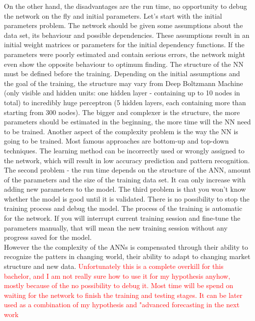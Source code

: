 \documentclass {article}
\begin{document}
On the other hand, the disadvantages are the run time, no opportunity to debug the network on the fly and initial parameters. Let's start with the initial parameters problem. The network should be given some assumptions about the data set, its behaviour and possible dependencies. These assumptions result in an initial weight matrices or parameters for the initial dependency functions. If the parameters were poorly estimated and contain serious errors, the network might even show the opposite behaviour to optimum finding. The structure of the NN must be defined before the training. Depending on the initial assumptions and the goal of the training, the structure may vary from Deep Boltzmann Machine (only visible and hidden units: one hidden layer - containing up to 10 nodes in total) to incredibly huge perceptron (5 hidden layers, each containing more than starting from 300 nodes). The bigger and complexer is the structure, the more parameters should be estimated in the beginning, the more time will the NN need to be trained. Another aspect of the complexity problem is the way the NN is going to be trained. Most famous approaches are bottom-up and top-down techniques. The learning method can be incorrectly used or wrongly assigned to the network, which will result in low accuracy prediction and pattern recognition. The second problem - the run time depends on the structure of the ANN, amount of the parameters and the size of the training data set. It can only increase with adding new parameters to the model. The third problem is that you won't know whether the model is good until it is validated. There is no possibility to stop the training process and debug the model. The process of the training is automatic for the network. If you will interrupt current training session and fine-tune the parameters manually, that will mean the new training session without any progress saved for the model.\\
However the the complexity of the ANNs is compensated through their ability to recognize the patters in changing world, their ability to adapt to changing market structure and new data. \textcolor{red}{Unfortunately this is a complete overkill for this bachelor, and I am not really sure how to use it for my hypothesis anyhow, mostly because of the no possibility to debug it. Most time will be spend on waiting for the network to finish the training and testing stages. It can be later used as a combination of my hypothesis and "advanced forecasting in the next work} \\
\end{document}
